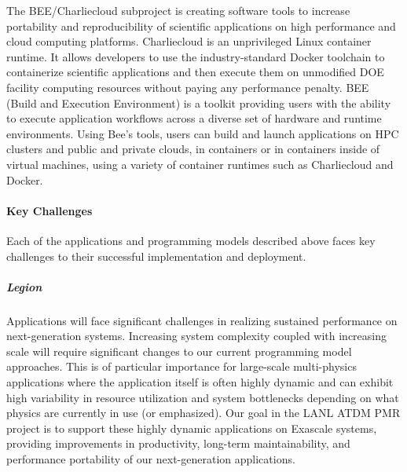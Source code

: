 The BEE/Charliecloud subproject is creating software tools to increase portability
and reproducibility of scientific applications on high performance and cloud
computing platforms.  Charliecloud \cite{priedhorskyrrandlestc2016} is an unprivileged Linux container
runtime.  It allows developers to use the industry-standard Docker
\cite{dockerinc}
toolchain to containerize scientific applications and then execute them on
unmodified DOE facility computing resources without paying any performance
penalty.  BEE \cite{beeproject} (Build and Execution Environment) is a toolkit providing
users with the ability to execute application workflows across a diverse set of
hardware and runtime environments.  Using Bee's tools, users can build and
launch applications on HPC clusters and public and private clouds, in
containers or in containers inside of virtual machines, using a variety of
container runtimes such as Charliecloud and Docker. 



\paragraph{Key Challenges} %
Each of the applications and programming models described above faces key challenges to their successful implementation and deployment.

\subparagraph{Legion}

Applications will face significant challenges in realizing sustained performance on next-generation systems. Increasing system complexity coupled with increasing scale will require significant changes to our current programming model approaches. This is of particular importance for large-scale multi-physics applications where the application itself is often highly dynamic and can exhibit high variability in resource utilization and system bottlenecks depending on what physics are currently in use (or emphasized). Our goal in the LANL ATDM PMR project is to support these highly dynamic applications on Exascale systems, providing improvements in productivity, long-term maintainability, and performance portability of our next-generation applications. 

